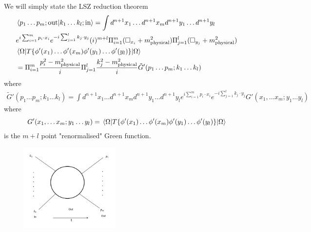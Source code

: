     We will simply state the LSZ reduction theorem
    \begin{align}
        & \expval{ p_1 \dots p_m; \text{out}  | k_1 \dots k_l ; \text{in}   }   =  \int d^{n+1} x_1 \dots d^{n+1} x_m d^{n+1} y_1 \dots d^{n+1} y_{l} \nonumber\\
        & e^{i \sum_{i=1}^{m}  p_i \cdot x_i } e^{-i \sum_{j=1}^{l}  k_j \cdot y_j } (i)^{m+l} \Pi_{i=1}^{m} (\Box_{x_i}  + m_{\text{physical}}^{2}) \Pi_{j=1}^{l} (\Box_{y_j}   + m_{\text{physical}}^{2}) \nonumber\\
        & \mel{\Omega}{ T\{  \phi'(x_1) \dots \phi'(x_m)\phi'(y_1) \dots \phi'(y_l)  
 \}  }{\Omega} \nonumber\\
 & = \Pi_{i=1}^{m} \frac{p_{i}^{2} - m_{\text{physical}}^{2} }{i}\Pi_{j=1}^{l} \frac{k_{j}^{2} - m_{\text{physical}}^{2} }{i} \tilde{G}' (p_1 \dots p_m; k_1 \dots k_l)
    \end{align}
where 
\begin{align}
    \tilde{G}' (p_1 \dots p_m; k_1 \dots k_l) =  \int d^{n+1} x_1 \dots d^{n+1} x_m d^{n+1} y_1 \dots d^{n+1} y_{l}e^{i \sum_{i=1}^{m}  p_i \cdot x_i } e^{-i \sum_{j=1}^{l}  k_j \cdot y_j } G'(x_1, \dots x_m ; y_1 \dots y_l)
\end{align}
where
\begin{equation}
    G'(x_1, \dots x_m ; y_1 \dots y_l) = \mel{\Omega}{ T\{  \phi'(x_1) \dots \phi'(x_m)\phi'(y_1) \dots \phi'(y_l)  
 \}  }{\Omega}
\end{equation}
is the $m+l$ point "renormalised" Green function.
\begin{figure}[htp]
    \centering
    \includegraphics[width = 5cm]{Illustrations/Picture1.png}
    \label{fig:enter-label}
\end{figure}


